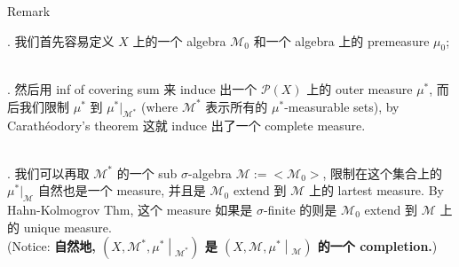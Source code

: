 \documentclass{qlnotes-export}
\begin{document}
\begin{qlremark}{Remark}

. 我们首先容易定义 \(X\) 上的一个 algebra \(\mathcal{M}_{0}\) 和一个 algebra 上的 premeasure \(\mu_{0}\);\\
\strut \\
. 然后用 inf of covering sum 来 induce 出一个 \(\mathcal{P}(X)\) 上的 outer measure \(\mu^{\ast}\), 而后我们限制 \(\mu^{\ast}\) 到 \(\mu^{\ast}|_{\mathcal{M}^{\ast}}\) (where \(\mathcal{M}^{\ast}\) 表示所有的 \(\mu^{\ast}\)-measurable sets), by Carathéodory's theorem 这就 induce 出了一个 complete measure.\\
\strut \\
. 我们可以再取 \(\mathcal{M}^{\ast}\) 的一个 sub \(\sigma\)-algebra \(\mathcal{M} := < \mathcal{M}_{0} >\), 限制在这个集合上的 \(\mu^{\ast}|_{\mathcal{M}}\) 自然也是一个 measure, 并且是 \(\mathcal{M}_{0}\) extend 到 \(\mathcal{M}\) 上的 lartest measure. By Hahn-Kolmogrov Thm, 这个 measure 如果是 \(\sigma\)-finite 的则是 \(\mathcal{M}_{0}\) extend 到 \(\mathcal{M}\) 上的 unique measure.\\
(Notice: \textbf{自然地, \(\left. (X,\mathcal{M}^{\ast},\mu^{\ast} \middle| {}_{\mathcal{M}^{\ast}}) \right.\) 是 \(\left. (X,\mathcal{M},\mu^{\ast} \middle| {}_{\mathcal{M}}) \right.\) 的一个 completion.})

\end{qlremark}
\end{document}
